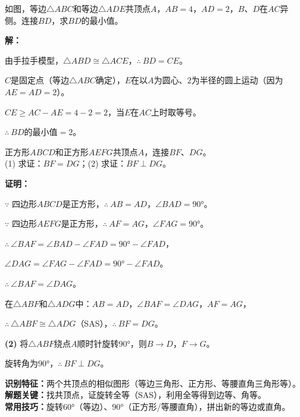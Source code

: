 \documentclass[12pt, a4paper]{ctexart}
\begin{document}
\begin{examplebox}[【例题3】等边三角形手拉手]
如图，等边$\triangle ABC$和等边$\triangle ADE$共顶点$A$，$AB=4$，$AD=2$，$B$、$D$在$AC$异侧。连接$BD$，求$BD$的最小值。
\end{examplebox}

\textbf{解：}

由手拉手模型，$\triangle ABD \cong \triangle ACE$，$\therefore\ BD = CE$。

$C$是固定点（等边$\triangle ABC$确定），$E$在以$A$为圆心、$2$为半径的圆上运动（因为$AE = AD = 2$）。

$CE \geqslant AC - AE = 4 - 2 = 2$，当$E$在$AC$上时取等号。

$\therefore\ BD$的最小值$= \boxed{2}$。

\begin{examplebox}[【例题4】正方形手拉手]
正方形$ABCD$和正方形$AEFG$共顶点$A$，连接$BF$、$DG$。\\
(1) 求证：$BF = DG$；\quad (2) 求证：$BF \perp DG$。
\end{examplebox}

\textbf{证明：}

$\because$ 四边形$ABCD$是正方形，$\therefore\ AB = AD$，$\angle BAD = 90°$。

$\because$ 四边形$AEFG$是正方形，$\therefore\ AF = AG$，$\angle FAG = 90°$。

$\therefore\ \angle BAF = \angle BAD - \angle FAD = 90° - \angle FAD$，

\phantom{$\therefore$}$\angle DAG = \angle FAG - \angle FAD = 90° - \angle FAD$。

$\therefore\ \angle BAF = \angle DAG$。

在$\triangle ABF$和$\triangle ADG$中：$AB = AD$，$\angle BAF = \angle DAG$，$AF = AG$，

$\therefore\ \triangle ABF \cong \triangle ADG$（SAS），$\therefore\ BF = DG$。

\textbf{(2)} 将$\triangle ABF$绕点$A$顺时针旋转$90°$，则$B \to D$，$F \to G$。

旋转角为$90°$，$\therefore\ BF \perp DG$。

\begin{tipbox}
\textbf{识别特征：}两个共顶点的相似图形（等边三角形、正方形、等腰直角三角形等）。\\
\textbf{解题关键：}找共顶点，证旋转全等（SAS），利用全等得到边等、角等。\\
\textbf{常用技巧：}旋转$60°$（等边）、$90°$（正方形/等腰直角），拼出新的等边或直角。
\end{tipbox}
\end{document}
